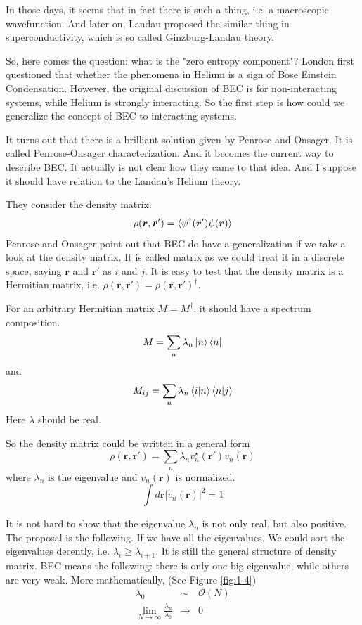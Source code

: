 In those days, it seems that in fact there is such a thing, i.e. a macroscopic wavefunction. And later on, Landau proposed the similar thing in superconductivity, which is so called Ginzburg-Landau theory. 

So, here comes the question: what is the "zero entropy component"? 
London first questioned that whether the phenomena in Helium is a sign of Bose Einstein Condensation. However, the original discussion of BEC is for non-interacting systems, while Helium is strongly interacting. So the first step is how could we generalize the concept of BEC to interacting systems.

It turns out that there is a brilliant solution given by Penrose and Onsager. It is called Penrose-Onsager characterization. And it becomes the current way to describe BEC. It actually is not clear how they came to that idea. And I suppose it should have relation to the Landau's Helium theory.  

They consider the density matrix. 
\begin{equation}
\rho(\bm r, \bm r') = \braket{\psi^\dag(\bm r')\psi(\bm r)}
\end{equation}
Penrose and Onsager point out that BEC do have a generalization if we take a look at the density matrix.
It is called matrix as we could treat it in a discrete space, saying $\bm r$ and $\bm r'$ as $i$ and $j$. It is easy to test that the density matrix is a Hermitian matrix, i.e. $\rho(\bm r, \bm r') = \rho(\bm r, \bm r')^\dag$. 

For an arbitrary Hermitian matrix $M=M^\dag$, it should have a spectrum composition.
\begin{equation}
M=\sum_n \lambda_n \ket{n}\bra{n}
\end{equation}
and 
\begin{equation}
M_{ij} = \sum_n \lambda_n \braket{i|n}\braket{n|j}
\end{equation}
Here $\lambda$ should be real. 

So the density matrix could be written in a general form
\begin{equation} 
\rho(\bm r, \bm r') = \sum_n \lambda_n v_n^\star(\bm r') v_n(\bm r)
\end{equation}
where $\lambda_n$ is the eigenvalue and $v_n(\bm r)$ is normalized.
\begin{equation}
\int d \bm r |v_n(\bm r)|^2 = 1 
\end{equation}

It is not hard to show that the eigenvalue $\lambda_n$ is not only real, but also positive.
The proposal is the following. If we have all the eigenvalues. We could sort the eigenvalues decently, i.e. $\lambda_i \geq \lambda_{i+1}$.   
It is still the general structure of density matrix. 
BEC means the following: there is only one big eigenvalue, while others are very weak. More mathematically, (See Figure \ref{fig:1-4})
\begin{eqnarray}
\lambda_0 &\sim & \mathscr{O}(N)\\
\lim_{N\rightarrow \infty}\frac{\lambda_n}{\lambda_0} &\rightarrow & 0
\end{eqnarray}

